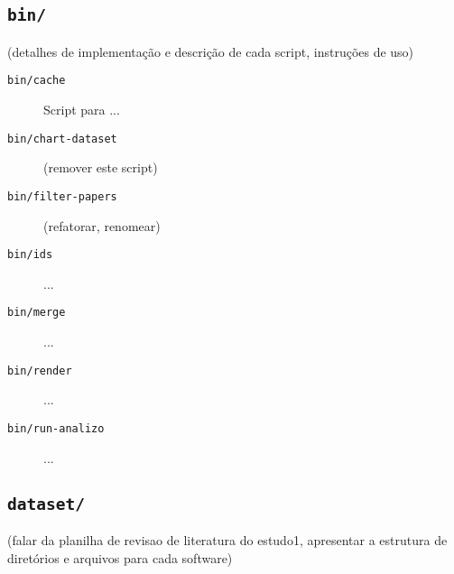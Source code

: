 \subsection{\texttt{bin/}}

(detalhes de implementação e descrição de cada script, instruções de uso)

\begin{description}
  \item [\texttt{bin/cache}] Script para ...
  \item [\texttt{bin/chart-dataset}] (remover este script)
  \item [\texttt{bin/filter-papers}] (refatorar, renomear)
  \item [\texttt{bin/ids}] ...
  \item [\texttt{bin/merge}] ...
  \item [\texttt{bin/render}] ...
  \item [\texttt{bin/run-analizo}] ...
\end{description}

\subsection{\texttt{dataset/}}

(falar da planilha de revisao de literatura do estudo1,
apresentar a estrutura de diretórios e arquivos para cada software)

